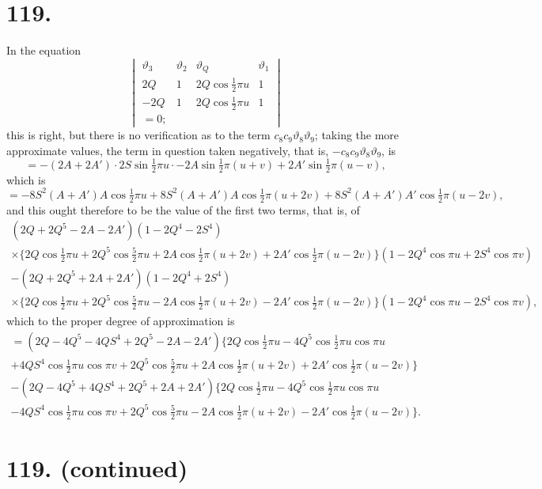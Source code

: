 \documentclass[11pt,a4paper]{article}
\newcommand{\uth}[1]{\vartheta_{#1}}
\begin{document}
\newpage
\section*{119.}
\label{sec:119}

In the equation
\[
\begin{vmatrix}
\uth{3} & \uth{2} & \uth{Q} & \uth{1} \\
2Q & 1 & 2Q\cos\tfrac{1}{2}\pi u & 1 \\
-2Q & 1 & 2Q\cos\tfrac{1}{2}\pi u & 1 \\
= 0;
\end{vmatrix}
\]
this is right, but there is no verification as to the term $c_8c_9\uth{8}\uth{9}$; taking the more approximate values, the term in question taken negatively, that is, $-c_8c_9\uth{8}\uth{9}$, is
\[
= -(2A + 2A') \cdot 2S\sin\tfrac{1}{2}\pi u \cdot -2A\sin\tfrac{1}{2}\pi(u+v) + 2A'\sin\tfrac{1}{2}\pi(u-v),
\]
which is
\[
= -8S^2(A + A')A\cos\tfrac{1}{2}\pi u + 8S^2(A + A')A\cos\tfrac{1}{2}\pi(u+2v) + 8S^2(A + A')A'\cos\tfrac{1}{2}\pi(u-2v),
\]
and this ought therefore to be the value of the first two terms, that is, of
\begin{multline*}
(2Q + 2Q^5 - 2A - 2A')(1 - 2Q^4 - 2S^4) \\
\times \{2Q\cos\tfrac{1}{2}\pi u + 2Q^5\cos\tfrac{5}{2}\pi u + 2A\cos\tfrac{1}{2}\pi(u+2v) + 2A'\cos\tfrac{1}{2}\pi(u-2v)\}(1 - 2Q^4\cos\pi u + 2S^4\cos\pi v) \\
- (2Q + 2Q^5 + 2A + 2A')(1 - 2Q^4 + 2S^4) \\
\times \{2Q\cos\tfrac{1}{2}\pi u + 2Q^5\cos\tfrac{5}{2}\pi u - 2A\cos\tfrac{1}{2}\pi(u+2v) - 2A'\cos\tfrac{1}{2}\pi(u-2v)\}(1 - 2Q^4\cos\pi u - 2S^4\cos\pi v),
\end{multline*}
which to the proper degree of approximation is
\begin{multline*}
= (2Q - 4Q^5 - 4QS^4 + 2Q^5 - 2A - 2A') \{2Q\cos\tfrac{1}{2}\pi u - 4Q^5\cos\tfrac{1}{2}\pi u\cos\pi u \\
+ 4QS^4\cos\tfrac{1}{2}\pi u\cos\pi v + 2Q^5\cos\tfrac{5}{2}\pi u + 2A\cos\tfrac{1}{2}\pi(u+2v) + 2A'\cos\tfrac{1}{2}\pi(u-2v)\} \\
- (2Q - 4Q^5 + 4QS^4 + 2Q^5 + 2A + 2A') \{2Q\cos\tfrac{1}{2}\pi u - 4Q^5\cos\tfrac{1}{2}\pi u\cos\pi u \\
- 4QS^4\cos\tfrac{1}{2}\pi u\cos\pi v + 2Q^5\cos\tfrac{5}{2}\pi u - 2A\cos\tfrac{1}{2}\pi(u+2v) - 2A'\cos\tfrac{1}{2}\pi(u-2v)\}.
\end{multline*}

\newpage
\section*{119. (continued)}
\label{sec:119cont}
\end{document}
